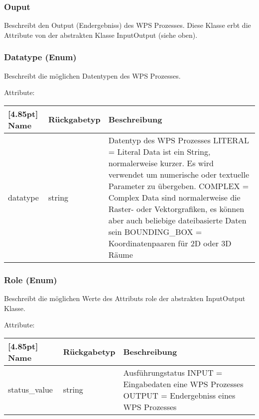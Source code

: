         \subsubsection{Ouput}
			Beschreibt den Output (Endergebniss) des WPS Prozesses. \newline
			Diese Klasse erbt die Attribute von der abstrakten Klasse InputOutput (siehe oben).
 
        \subsubsection{Datatype (Enum)}	
			Beschreibt die möglichen Datentypen des WPS Prozesses. \newline
			
			Attribute:
			\begin{center}
				\setlength\tabcolsep{5pt}
				\renewcommand{\arraystretch}{1.5}
				
				\begin{tabularx}{\textwidth}{|l|l|X|}
					\hline
					\rowcolor[gray]{0.75}[4.85pt]   
					Name & Rückgabetyp & Beschreibung \\ \hline 
	           		datatype & string & Datentyp des WPS Prozesses\newline
	           		LITERAL =  Literal Data ist ein String, normalerweise kurzer. Es wird verwendet um numerische oder textuelle Parameter zu übergeben.   \newline
	           		COMPLEX = Complex Data sind normalerweise die Raster- oder Vektorgrafiken, es können aber auch beliebige dateibasierte Daten sein\newline 
	           		BOUNDING_BOX = Koordinatenpaaren für 2D oder 3D Räume \\ \hline
				\end{tabularx}
			\end{center}

		\subsubsection{Role (Enum)}
			Beschreibt die möglichen Werte des Attributs role der abstrakten InputOutput Klasse. \newline
			
			Attribute:
			\begin{center}
				\setlength\tabcolsep{5pt}
				\renewcommand{\arraystretch}{1.5}
				
				\begin{tabularx}{\textwidth}{|l|l|X|}
					\hline
					\rowcolor[gray]{0.75}[4.85pt]
					Name & Rückgabetyp & Beschreibung \\ \hline 
	           		status\_value & string & Ausführungstatus\newline
	           		INPUT = Eingabedaten eine WPS Prozesses \newline
	           		OUTPUT = Endergebniss eines WPS Prozesses \\ \hline
				\end{tabularx}
			\end{center}
